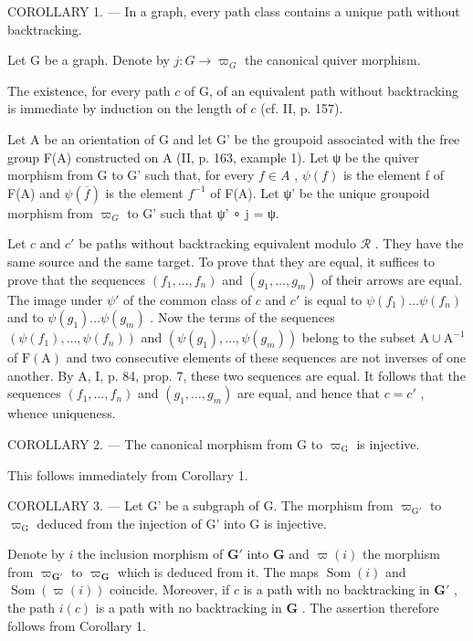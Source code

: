 COROLLARY 1. --- In a graph, every path class contains a unique path without backtracking.

Let G be a graph. Denote by \(j\colon G\to\varpi_{G}\) the canonical quiver morphism.

The existence, for every path \(c\) of G, of an equivalent path without backtracking is immediate by induction on the length of \(c\) (cf. II, p. 157).

Let A be an orientation of G and let G' be the groupoid associated with the free group F(A) constructed on A (II, p. 163, example 1). Let ψ be the quiver morphism from G to G' such that, for every \(f \in A\) , \(\psi(f)\) is the element f of F(A) and \(\psi(\overline{f})\) is the element \(f^{-1}\) of F(A). Let ψ' be the unique groupoid morphism from \(\varpi_{G}\) to G' such that ψ' ∘ j = ψ.

Let \(c\) and \(c'\) be paths without backtracking equivalent modulo \(\mathcal{R}\) . They have the same source and the same target. To prove that they are equal, it suffices to prove that the sequences \((f_1, \ldots, f_n)\) and \((g_1, \ldots, g_m)\) of their arrows are equal. The image under \(\psi'\) of the common class of \(c\) and \(c'\) is equal to \(\psi(f_1) \ldots \psi(f_n)\) and to \(\psi(g_1) \ldots \psi(g_m)\) . Now the terms of the sequences \((\psi(f_1), \ldots, \psi(f_n))\) and \((\psi(g_1), \ldots, \psi(g_m))\) belong to the subset \(\mathrm{A} \cup \mathrm{A}^{-1}\) of \(\mathrm{F(A)}\) and two consecutive elements of these sequences are not inverses of one another. By A, I, p. 84, prop. 7, these two sequences are equal. It follows that the sequences \((f_{1},\ldots,f_{n})\) and \((g_{1},\ldots,g_{m})\) are equal, and hence that \(c=c'\) , whence uniqueness.

COROLLARY 2. --- The canonical morphism from G to \(\varpi_{\mathrm{G}}\) is injective.

This follows immediately from Corollary 1.

COROLLARY 3. --- Let G' be a subgraph of G. The morphism from \(\varpi_{\mathrm{G}'}\) to \(\varpi_{\mathrm{G}}\) deduced from the injection of G' into G is injective.

Denote by \(i\) the inclusion morphism of \(\mathbf{G}'\) into \(\mathbf{G}\) and \(\varpi(i)\) the morphism from \(\varpi_{\mathbf{G}'}\) to \(\varpi_{\mathbf{G}}\) which is deduced from it. The maps \(\operatorname{Som}(i)\) and \(\operatorname{Som}(\varpi(i))\) coincide. Moreover, if \(c\) is a path with no backtracking in \(\mathbf{G}'\) , the path \(i(c)\) is a path with no backtracking in \(\mathbf{G}\) . The assertion therefore follows from Corollary 1.

